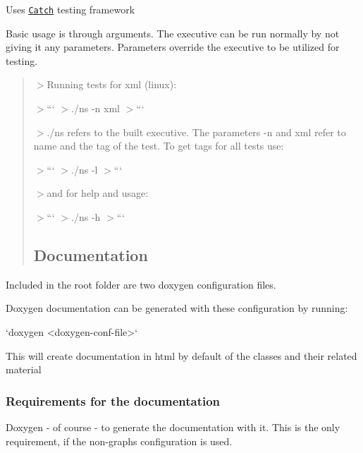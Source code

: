 \begin{DoxyItemize}
\item Uses \href{https://github.com/philsquared/Catch}{\tt Catch} testing framework
\item Basic usage is through arguments. The executive can be run normally by not giving it any parameters. Parameters override the executive to be utilized for testing. \begin{quote}


$>$Running tests for xml (linux)\+:

$>$``` $>$./ns -\/n xml $>$```

$>$./ns refers to the built executive. The parameters -\/n and xml refer to \textquotesingle{}name\textquotesingle{} and the tag of the test. To get tags for all tests use\+:

$>$``` $>$./ns -\/l $>$```

$>$and for help and usage\+:

$>$``` $>$./ns -\/h $>$```

\subsection*{}



\subsection*{Documentation}

\end{quote}

\item Included in the root folder are two doxygen configuration files.
\end{DoxyItemize}

Doxygen documentation can be generated with these configuration by running\+: \begin{DoxyVerb}`doxygen <doxygen-conf-file>`
\end{DoxyVerb}


This will create documentation in html by default of the classes and their related material

\subsubsection*{Requirements for the documentation}

Doxygen -\/ of course -\/ to generate the documentation with it. This is the only requirement, if the non-\/graphs configuration is used.

